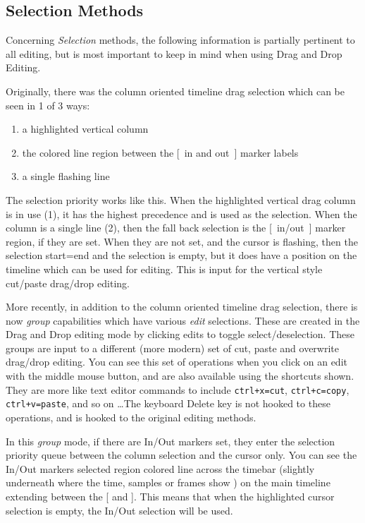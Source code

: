 \subsection{Selection Methods}%
\label{sub:selection_method}

Concerning \textit{Selection} methods, the following information is
partially pertinent to all editing, but is most important to keep in
mind when using Drag and Drop Editing.

Originally, there was the column oriented timeline drag selection
which can be seen in 1 of 3 ways:

\begin{enumerate}
\item a highlighted vertical column
\item the colored line region between the [~in and out~] marker
  labels
\item a single flashing line
\end{enumerate}

The selection priority works like this. When the highlighted
vertical drag column is in use (1), it has the highest precedence
and is used as the selection.  When the column is a single line (2),
then the fall back selection is the [~in/out~] marker region, if
they are set.  When they are not set, and the cursor is flashing,
then the selection start=end and the selection is empty, but it does
have a position on the timeline which can be used for editing.  This
is input for the vertical style cut/paste drag/drop editing.

More recently, in addition to the column oriented timeline drag
selection, there is now \textit{group}  capabilities which have
various \textit{edit} selections.  These are created in the Drag and
Drop editing mode by clicking edits to toggle
select/deselection.  These groups are input to a different (more
modern) set of cut, paste and overwrite drag/drop editing.  You
can see this set of operations when you click on an edit with the
middle mouse button, and are also available using the shortcuts
shown. They are more like text editor commands to include
\texttt{ctrl+x=cut}, \texttt{ctrl+c=copy}, \texttt{ctrl+v=paste},
and so on \dots The keyboard Delete key is not hooked to these
operations, and is hooked to the original editing methods.

In this \textit{group} mode, if there are In/Out  markers set, they
enter the selection priority queue between the column selection and
the cursor only. You can see the In/Out markers selected region
colored line across the timebar (slightly underneath where the time,
samples or frames show ) on the main timeline extending between the
[ and ].  This means that when the highlighted cursor selection is
empty, the In/Out selection will be used.

